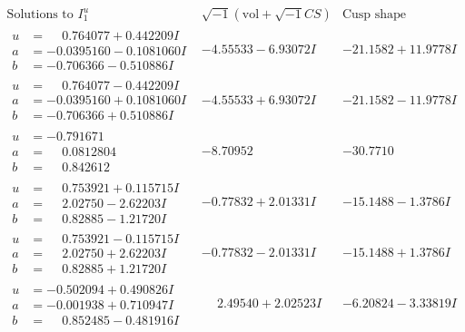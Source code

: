 \documentclass[1p]{elsarticle_modified}
\theoremstyle{definition}
\newcommand{\I}{\sqrt{-1}}
\begin{document}
$$\begin{array}{c|c|c}  
\text{Solutions to }I^u_{1}& \I (\text{vol} + \sqrt{-1}CS) & \text{Cusp shape}\\
 \hline 
\begin{aligned}
u &= \phantom{-}0.764077 + 0.442209 I \\
a &= -0.0395160 - 0.1081060 I \\
b &= -0.706366 - 0.510886 I\end{aligned}
 & -4.55533 - 6.93072 I & -21.1582 + 11.9778 I \\ \hline\begin{aligned}
u &= \phantom{-}0.764077 - 0.442209 I \\
a &= -0.0395160 + 0.1081060 I \\
b &= -0.706366 + 0.510886 I\end{aligned}
 & -4.55533 + 6.93072 I & -21.1582 - 11.9778 I \\ \hline\begin{aligned}
u &= -0.791671\phantom{ +0.000000I} \\
a &= \phantom{-}0.0812804\phantom{ +0.000000I} \\
b &= \phantom{-}0.842612\phantom{ +0.000000I}\end{aligned}
 & -8.70952\phantom{ +0.000000I} & -30.7710\phantom{ +0.000000I} \\ \hline\begin{aligned}
u &= \phantom{-}0.753921 + 0.115715 I \\
a &= \phantom{-}2.02750 - 2.62203 I \\
b &= \phantom{-}0.82885 - 1.21720 I\end{aligned}
 & -0.77832 + 2.01331 I & -15.1488 - 1.3786 I \\ \hline\begin{aligned}
u &= \phantom{-}0.753921 - 0.115715 I \\
a &= \phantom{-}2.02750 + 2.62203 I \\
b &= \phantom{-}0.82885 + 1.21720 I\end{aligned}
 & -0.77832 - 2.01331 I & -15.1488 + 1.3786 I \\ \hline\begin{aligned}
u &= -0.502094 + 0.490826 I \\
a &= -0.001938 + 0.710947 I \\
b &= \phantom{-}0.852485 - 0.481916 I\end{aligned}
 & \phantom{-}2.49540 + 2.02523 I & -6.20824 - 3.33819 I \\ \hline\begin{aligned}

\end{aligned}
\end{array}$$
\end{document}
